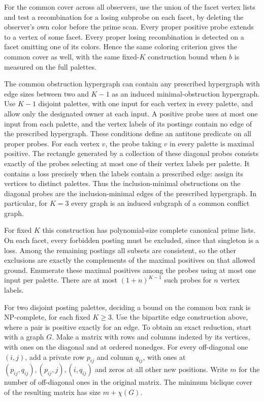 For the common cover across all observers, use the union of the
facet vertex lists and test a recombination for a losing subprobe
on each facet, by deleting the observer's own color before the
prime scan. Every proper positive probe extends to a vertex of
some facet. Every proper losing recombination is detected on a
facet omitting one of its colors. Hence the same coloring
criterion gives the common cover as well, with the same fixed-$K$
construction bound when $b$ is measured on the full palettes.

The common obstruction hypergraph can contain any prescribed
hypergraph with edge sizes between two and $K-1$ as an induced
minimal-obstruction hypergraph. Use $K-1$ disjoint palettes, with
one input for each vertex in every palette, and allow only the
designated owner at each input. A positive probe uses at most one
input from each palette, and the vertex labels of its postings
contain no edge of the prescribed hypergraph. These conditions
define an antitone predicate on all proper probes. For each vertex
$v$, the probe taking $v$ in every palette is maximal positive.
The rectangle generated by a collection of these diagonal probes
consists exactly of the probes selecting at most one of their
vertex labels per palette. It contains a loss precisely when the
labels contain a prescribed edge: assign its vertices to distinct
palettes. Thus the inclusion-minimal obstructions on the diagonal
probes are the inclusion-minimal edges of the prescribed
hypergraph. In particular, for $K=3$ every graph is an induced
subgraph of a common conflict graph.

For fixed $K$ this construction has polynomial-size complete
canonical prime lists. On each facet, every forbidden posting
must be excluded, since that singleton is a loss. Among the
remaining postings all subsets are consistent, so the other
exclusions are exactly the complements of the maximal positives
on that allowed ground. Enumerate these maximal positives among
the probes using at most one input per palette. There are at
most $(1+n)^{K-1}$ such probes for $n$ vertex labels.

For two disjoint posting palettes, deciding a bound on
the common box rank is NP-complete, for each fixed
$K\ge3$. Use the bipartite edge construction above,
where a pair is positive exactly for an edge. To obtain
an exact reduction, start with a graph $G$. Make a
matrix with rows and columns indexed by its vertices,
with ones on the diagonal and at ordered nonedges.
For every off-diagonal one $(i,j)$, add a private row
$p_{ij}$ and column $q_{ij}$, with ones at
$(p_{ij},q_{ij}),(p_{ij},j),(i,q_{ij})$ and zeros at
all other new positions. Write $m$ for the number of
off-diagonal ones in the original matrix. The minimum
biclique cover of the resulting matrix has size
$m+\chi(G)$.

